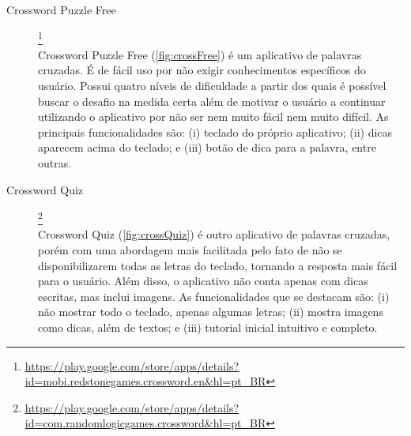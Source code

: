 \begin{description}

\item[Crossword Puzzle Free]\footnote{\url{https://play.google.com/store/apps/details?id=mobi.redstonegames.crossword.en&hl=pt_BR}} \hfill \\
Crossword Puzzle Free (\autoref{fig:crossFree}) é um aplicativo de palavras cruzadas. É de fácil  uso por não exigir conhecimentos específicos do usuário. Possui quatro níveis de dificuldade a partir dos quais é possível buscar o desafio na medida certa além de motivar o usuário a continuar utilizando o aplicativo por não ser nem muito fácil nem muito difícil. As principais funcionalidades são: (i) teclado do próprio aplicativo; (ii) dicas aparecem acima do teclado; e (iii) botão de dica para a palavra, entre outras.


    

\item[Crossword Quiz]\footnote{\url{https://play.google.com/store/apps/details?id=com.randomlogicgames.crossword&hl=pt_BR}} \hfill \\
Crossword Quiz (\autoref{fig:crossQuiz}) é outro aplicativo de palavras cruzadas, porém com uma abordagem mais facilitada pelo fato de não se disponibilizarem todas as letras do teclado, tornando a resposta mais fácil para o usuário. Além disso, o aplicativo não conta apenas com dicas escritas, mas inclui imagens. As funcionalidades que se destacam são: (i) não mostrar todo o teclado, apenas algumas letras; (ii) mostra imagens como dicas, além de textos; e (iii) tutorial inicial intuitivo e completo.

    



\end{description}
